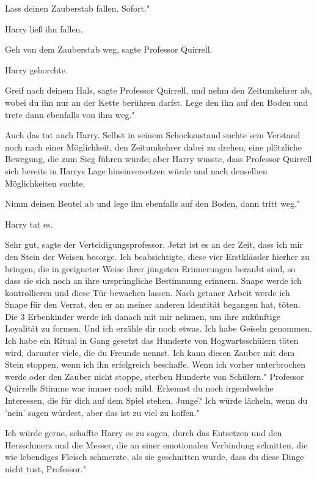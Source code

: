 \glqq Lass deinen Zauberstab fallen. Sofort."

Harry ließ ihn fallen.

\glqq Geh von dem Zauberstab weg\grqq{}, sagte Professor Quirrell.

Harry gehorchte.

\glqq Greif nach deinem Hals\grqq{}, sagte Professor Quirrell, \glqq und nehm
den Zeitumkehrer ab, wobei du ihn nur an der Kette berühren darfst. Lege den ihn
auf den Boden und trete dann ebenfalls von ihm weg."

Auch das tat auch Harry. Selbst in seinem Schockzustand suchte sein Verstand
noch nach einer Möglichkeit, den Zeitumkehrer dabei zu drehen, eine plötzliche
Bewegung, die zum Sieg führen würde; aber Harry wusste, dass Professor Quirrell
sich bereits in Harrys Lage hineinversetzen würde und nach denselben
Möglichkeiten suchte.

\glqq Nimm deinen Beutel ab und lege ihn ebenfalls auf den Boden, dann tritt
weg."

Harry tat es.

\glqq Sehr gut\grqq{}, sagte der Verteidigungsprofessor. \glqq Jetzt ist es an
der Zeit, dass ich mir den Stein der Weisen besorge. Ich beabsichtigte, diese
vier Erstklässler hierher zu bringen, die in geeigneter Weise ihrer jüngsten
Erinnerungen beraubt sind, so dass sie sich noch an ihre ursprüngliche
Bestimmung erinnern. Snape werde ich kontrollieren und diese Tür bewachen
lassen. Nach getaner Arbeit werde ich Snape für den Verrat, den er an meiner
anderen Identität begangen hat, töten. Die 3 Erbenkinder werde ich danach mit
mir nehmen, um ihre zukünftige Loyalität zu formen. Und ich erzähle dir noch
etwas. Ich habe Geiseln genommen. Ich habe ein Ritual in Gang gesetzt das
Hunderte von Hogwartsschülern töten wird, darunter viele, die du Freunde nennst.
Ich kann diesen Zauber mit dem Stein stoppen, wenn ich ihn erfolgreich
beschaffe. Wenn ich vorher unterbrochen werde oder den Zauber nicht stoppe,
sterben Hunderte von Schülern." Professor Quirrells Stimme war immer noch mild.
\glqq Erkennst du noch irgendwelche Interessen, die für dich auf dem Spiel
stehen, Junge? Ich würde lächeln, wenn du 'nein' sagen würdest, aber das ist zu
viel zu hoffen."

\glqq Ich würde gerne\grqq{}, schaffte Harry es zu sagen, durch das Entsetzen
und den Herzschmerz und die Messer, die an einer emotionalen Verbindung
schnitten, die wie lebendiges Fleisch schmerzte, als sie geschnitten wurde,
\glqq dass du diese Dinge nicht tust, Professor."

